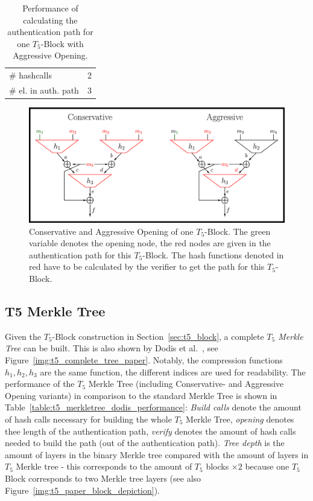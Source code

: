 \begin{table}
\centering
\begin{tabular}{l c} 
 \hline\noalign{\smallskip}
 \multicolumn{2}{c}{\textbf{Aggressive Opening}} \\
 \hline\noalign{\smallskip}
 \# hashcalls & 2 \\
 \# el. in auth. path & 3 \\
 \hline
\end{tabular}
\caption{Performance of calculating the authentication path for one $T_5$-Block with Aggressive Opening.}
\label{table:aggr_opening}
\end{table}

\begin{figure}
\centering
\includegraphics[]{images/Methods/aggr_conserv_opening_T5.png}
\caption{Conservative and Aggressive Opening of one $T_5$-Block. The green variable denotes the opening node, the red nodes are given in the authentication path for this $T_5$-Block. The hash functions denoted in red have to be calculated by the verifier to get the path for this $T_5$-Block.~\cite{T5_paper}}
\label{img:t5_conserv_aggr_opening}
\end{figure}

\subsection{T5 Merkle Tree}
Given the $T_5$-Block construction in Section~\ref{sec:t5_block}, a complete \textit{$T_5$ Merkle Tree} can be built. This is also shown by Dodis et al.~\cite{T5_paper}, see Figure~\ref{img:t5_complete_tree_paper}. Notably, the compression functions $h_1, h_2, h_3$ are the same function, the different indices are used for readability. The performance of the $T_5$ Merkle Tree (including Conservative- and Aggressive Opening variants) in comparison to the standard Merkle Tree is shown in Table~\ref{table:t5_merkletree_dodis_performance}: \textit{Build calls} denote the amount of hash calls necessary for building the whole $T_5$ Merkle Tree, \textit{opening} denotes thee length of the authentication path, \textit{verify} denotes the amount of hash calls needed to build the path (out of the authentication path). \textit{Tree depth} is the amount of layers in the binary Merkle tree compared with the amount of layers in $T_5$ Merkle tree - this corresponds to the amount of $T_5$ blocks $\times 2$ because one $T_5$ Block corresponds to two Merkle tree layers (see also Figure~\ref{img:t5_paper_block_depiction}).

